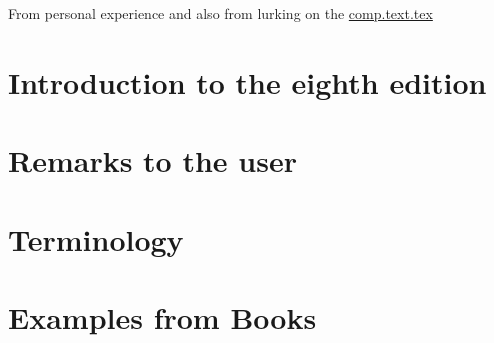 \documentclass[10pt,a4paper,extrafontsizes]{memoir}
\newcommand{\PWnote}[2]{}
\newcommand\svnidlong[4]{}
\begin{document}
    From personal experience and also from lurking on the \url{comp.text.tex}




\chapter{Introduction to the eighth edition}


\chapter{Remarks to the user}




\chapter{Terminology}



\cleardoublepage
{}

\mainmatter







\chapter{Examples from Books} %
\label{chap:examples_from_books}
\end{document}
